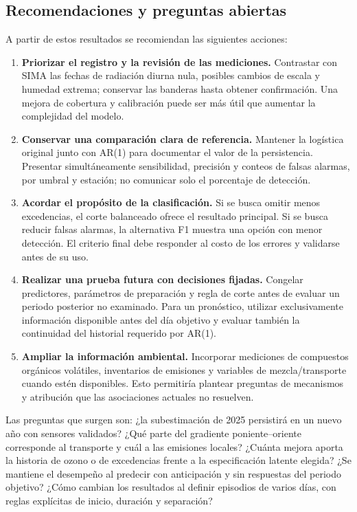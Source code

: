 \documentclass[11pt,letterpaper]{article}
\begin{document}
\subsection{Recomendaciones y preguntas abiertas}
A partir de estos resultados se recomiendan las siguientes acciones:
\begin{enumerate}
\setlength{\itemsep}{4pt}
\item \textbf{Priorizar el registro y la revisión de las mediciones.} Contrastar con SIMA las fechas de radiación diurna nula, posibles cambios de escala y humedad extrema; conservar las banderas hasta obtener confirmación. Una mejora de cobertura y calibración puede ser más útil que aumentar la complejidad del modelo.
\item \textbf{Conservar una comparación clara de referencia.} Mantener la logística original junto con AR(1) para documentar el valor de la persistencia. Presentar simultáneamente sensibilidad, precisión y conteos de falsas alarmas, por umbral y estación; no comunicar solo el porcentaje de detección.
\item \textbf{Acordar el propósito de la clasificación.} Si se busca omitir menos excedencias, el corte balanceado ofrece el resultado principal. Si se busca reducir falsas alarmas, la alternativa F1 muestra una opción con menor detección. El criterio final debe responder al costo de los errores y validarse antes de su uso.
\item \textbf{Realizar una prueba futura con decisiones fijadas.} Congelar predictores, parámetros de preparación y regla de corte antes de evaluar un periodo posterior no examinado. Para un pronóstico, utilizar exclusivamente información disponible antes del día objetivo y evaluar también la continuidad del historial requerido por AR(1).
\item \textbf{Ampliar la información ambiental.} Incorporar mediciones de compuestos orgánicos volátiles, inventarios de emisiones y variables de mezcla/transporte cuando estén disponibles. Esto permitiría plantear preguntas de mecanismos y atribución que las asociaciones actuales no resuelven.
\end{enumerate}

Las preguntas que surgen son: ¿la subestimación de 2025 persistirá en un nuevo año con sensores validados? ¿Qué parte del gradiente poniente--oriente corresponde al transporte y cuál a las emisiones locales? ¿Cuánta mejora aporta la historia de ozono o de excedencias frente a la especificación latente elegida? ¿Se mantiene el desempeño al predecir con anticipación y sin respuestas del periodo objetivo? ¿Cómo cambian los resultados al definir episodios de varios días, con reglas explícitas de inicio, duración y separación?
\end{document}
